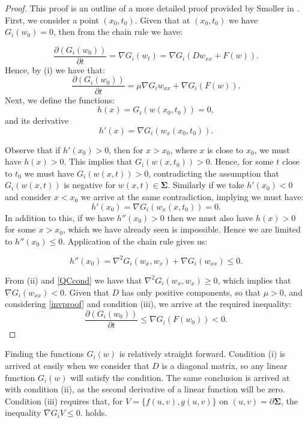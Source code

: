 \documentclass[12pt]{article}
\begin{document}
\begin{proof}

This proof is an outline of a more detailed proof provided by Smoller in \cite{Smoller}. First, we consider a point $(x_0,t_0)$. Given that at $(x_0,t_0)$ we have $G_i(w_0) = 0$, then from the chain rule we have:

$$\frac{\partial (G_i(w_0))}{\partial t} = \nabla G_i(w_t) = \nabla G_i(Dw_{xx}+F(w)).$$
Hence, by (i) we have that:
\begin{equation}\label{invproof}
\frac{\partial (G_i(w_0))}{\partial t} = \mu \nabla G_iw_{xx}+\nabla G_i(F(w)).
\end{equation}
Next, we define the functions:
$$h(x) = G_i(w(x_0,t_0)) = 0,$$ 
and its derivative 
$$h'(x) = \nabla G_i(w_x(x_0,t_0)).$$

Observe that if $h'(x_0) > 0$, then for $x > x_0$, where $x$ is close to $x_0$, we must have $h(x) > 0$. This implies that $G_i(w(x,t_0)) > 0$. Hence, for some $t$ close to $t_0$ we must have $G_i(w(x,t)) > 0$, contradicting the assumption that  $G_i(w(x,t))$ is negative for $w(x,t) \in \mathbf{\Sigma}$. Similarly if we take $h'(x_0) < 0$ and consider $x < x_0$ we arrive at the same contradiction, implying we must have: 
\begin{equation}\label{QCcond}
h'(x_0) = \nabla G_i(w_x(x,t_0)) = 0.
\end{equation}
In addition to this, if we have $h''(x_0)>0$ then we must also have $h(x)>0$ for some $x>x_0$, which we have already seen is impossible. Hence we are limited to $h''(x_0) \leq 0$. Application of the chain rule gives us:  
  
  $$h''(x_0) = \nabla^2G_i(w_x,w_x) + \nabla G_i(w_{xx}) \leq 0.$$
  
From (ii) and \eqref{QCcond} we have that  $\nabla^2G_i(w_x,w_x) \geq 0$, which implies that $\nabla G_i(w_{xx}) < 0$. Given that $D$ has only positive components, so that $\mu>0$, and considering \eqref{invproof} and condition (iii), we arrive at the required inequality:
$$\frac{\partial (G_i(w_0))}{\partial t} \leq \nabla G_i(F(w_0)) < 0.$$
\end{proof}

Finding the functions $G_i(w)$ is relatively straight forward. Condition (i) is arrived at easily when we consider that $D$ is a diagonal matrix, so any linear function $G_i(w)$ will satisfy the condition. The same conclusion is arrived at with condition (ii), as the second derivative of a linear function will be zero.  Condition (iii) requires that, for $V = \lbrace f(u,v),g(u,v)\rbrace$ on $(u,v)=\partial \mathbf{\Sigma}$, the inequality $\nabla G_i V \leq 0.$ holds. 
\end{document}
